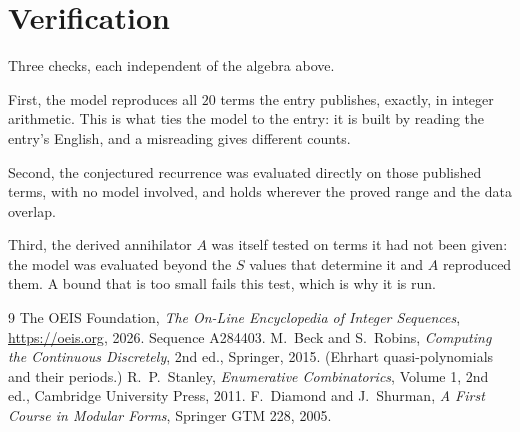\documentclass[11pt,a4paper]{article}
\theoremstyle{plain}
\theoremstyle{definition}
\begin{document}
\section{Verification}

Three checks, each independent of the algebra above.

First, the model reproduces all $20$ terms the entry publishes, exactly, in integer
arithmetic. This is what ties the model to the entry: it is built by reading the entry's
English, and a misreading gives different counts.

Second, the conjectured recurrence was evaluated directly on those published terms, with no
model involved, and holds wherever the proved range and the data overlap.

Third, the derived annihilator $A$ was itself tested on terms it had not been given: the model
was evaluated beyond the $S$ values that determine it and $A$ reproduced them. A bound that is
too small fails this test, which is why it is run.

\begin{thebibliography}{9}
 The OEIS Foundation, \emph{The On-Line Encyclopedia of Integer
Sequences}, \url{https://oeis.org}, 2026. Sequence A284403.
 M.~Beck and S.~Robins, \emph{Computing the Continuous Discretely},
2nd ed., Springer, 2015. (Ehrhart quasi-polynomials and their periods.)
 R.~P.~Stanley, \emph{Enumerative Combinatorics}, Volume 1, 2nd ed.,
Cambridge University Press, 2011.
 F.~Diamond and J.~Shurman, \emph{A First Course in Modular Forms},
Springer GTM 228, 2005.
\end{thebibliography}
\end{document}
